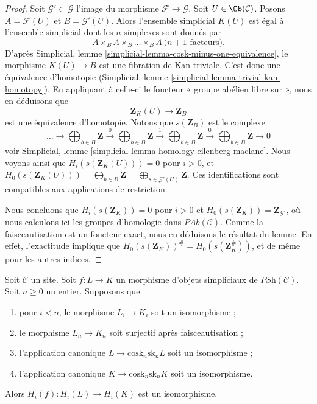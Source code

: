 \begin{proof}
Soit $\mathcal{G}' \subset \mathcal{G}$ l'image du
morphisme $\mathcal{F} \to \mathcal{G}$.
Soit $U \in \Ob(\mathcal{C})$. Posons
$A = \mathcal{F}(U)$ et $B = \mathcal{G}'(U)$.
Alors l'ensemble simplicial $K(U)$ est égal à l'ensemble
simplicial dont les $n$-simplexes sont donnés par
$$
A \times_B A \times_B \ldots \times_B A\ (n + 1 \text{ facteurs)}.
$$
D'après Simplicial, lemme \ref{simplicial-lemma-cosk-minus-one-equivalence},
le morphisme $K(U) \to B$ est une fibration de Kan triviale.
C'est donc une équivalence d'homotopie
(Simplicial, lemme \ref{simplicial-lemma-trivial-kan-homotopy}).
En appliquant à celle-ci le foncteur « groupe abélien libre sur »,
nous en déduisons que
$$
\mathbf{Z}_K(U) \longrightarrow \mathbf{Z}_B
$$
est une équivalence d'homotopie. Notons que $s(\mathbf{Z}_B)$ est
le complexe
$$
\ldots \to
\bigoplus\nolimits_{b \in B}\mathbf{Z} \xrightarrow{0}
\bigoplus\nolimits_{b \in B}\mathbf{Z} \xrightarrow{1}
\bigoplus\nolimits_{b \in B}\mathbf{Z} \xrightarrow{0}
\bigoplus\nolimits_{b \in B}\mathbf{Z} \to 0
$$
voir Simplicial, lemme \ref{simplicial-lemma-homology-eilenberg-maclane}.
Nous voyons ainsi que
$H_i(s(\mathbf{Z}_K(U))) = 0$ pour $i > 0$, et
$H_0(s(\mathbf{Z}_K(U))) = \bigoplus_{b \in B}\mathbf{Z}
= \bigoplus_{s \in \mathcal{G}'(U)} \mathbf{Z}$.
Ces identifications sont compatibles aux applications de
restriction.

\medskip\noindent
Nous concluons que $H_i(s(\mathbf{Z}_K)) = 0$ pour $i > 0$ et
$H_0(s(\mathbf{Z}_K)) = \mathbf{Z}_{\mathcal{G}'}$, où nous
calculons ici les groupes d'homologie dans $\textit{PAb}(\mathcal{C})$. Comme
la faisceautisation est un foncteur exact, nous en déduisons le résultat
du lemme. En effet, l'exactitude implique
que $H_0(s(\mathbf{Z}_K))^\# = H_0(s(\mathbf{Z}_K^\#))$,
et de même pour les autres indices.
\end{proof}

\begin{lemma}
\label{lemma-acyclicity}
Soit $\mathcal{C}$ un site.
Soit $f : L \to K$ un morphisme d'objets
simpliciaux de $\textit{PSh}(\mathcal{C})$.
Soit $n \geq 0$ un entier.
Supposons que
\begin{enumerate}
\item pour $i < n$, le morphisme $L_i \to K_i$ soit un isomorphisme ;
\item le morphisme $L_n \to K_n$ soit surjectif après faisceautisation ;
\item l'application canonique $L \to \text{cosk}_n \text{sk}_n L$ soit un isomorphisme ;
\item l'application canonique $K \to \text{cosk}_n \text{sk}_n K$ soit un isomorphisme.
\end{enumerate}
Alors $H_i(f) : H_i(L) \to H_i(K)$ est un isomorphisme.
\end{lemma}


